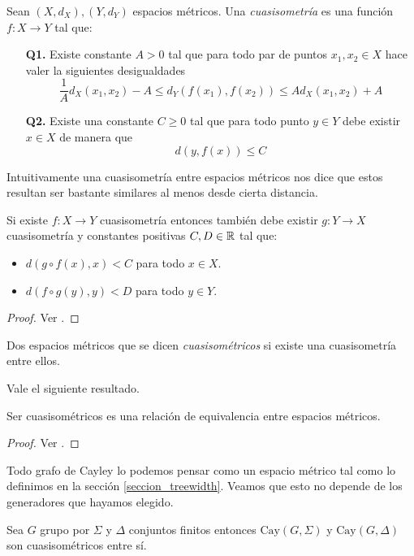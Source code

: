 \documentclass[tesis.tex]{subfiles}
\begin{document}
\begin{deff}
	Sean $(X,d_X),(Y,d_Y)$ espacios métricos. 
	Una \emph{cuasisometría} es una función $f:X \to Y$ tal que:
	\begin{itemize}
		\item[\textbf{Q1.}] Existe constante $A > 0$ tal que para todo par de puntos $x_1,x_2 \in X$ hace valer la siguientes desigualdades
		\[
		\frac{1}{A} d_X(x_1,x_2) - A \le d_Y(f(x_1),f(x_2)) \le A d_X(x_1,x_2) + A
		\]
		\item[\textbf{Q2.}] Existe una constante $C \ge 0$ tal que para todo punto $y \in Y$ debe existir $x \in X$ de manera que 
		\[
		d(y,f(x)) \le C
		\]
	\end{itemize}
\end{deff}

Intuitivamente una cuasisometría entre espacios métricos nos dice que estos resultan ser bastante similares al menos desde cierta distancia. 
\medskip
\begin{prop}
	Si existe $f:X \to Y$ cuasisometría entonces también debe existir $g:Y \to X$ cuasisometría y constantes positivas $C,D \in \mathbb{R}$ tal que:
	\begin{itemize}
		\item $d(g \circ f (x), x) < C$ para todo $x \in X$.
		\item $d(f \circ g (y), y) < D$ para todo $y \in Y$. 
	\end{itemize}
\end{prop}
\begin{proof}
	Ver \cite{loh2017geometric}.
\end{proof}

\begin{deff}
	Dos espacios métricos que se dicen \emph{cuasisométricos} si existe una cuasisometría entre ellos.
\end{deff}

Vale el siguiente resultado.
\begin{prop}
	Ser cuasisométricos es una relación de equivalencia entre espacios métricos.
\end{prop}
\begin{proof}
	Ver \cite{loh2017geometric}.
\end{proof}


Todo grafo de Cayley lo podemos pensar como un espacio métrico tal como lo definimos en la sección \ref{seccion_treewidth}.  
Veamos que esto no depende de los generadores que hayamos elegido.

\begin{prop}
	Sea $G$ grupo \fg por $\Sigma$ y $\Delta$ conjuntos finitos entonces $\text{Cay}(G,\Sigma)$ y $\text{Cay}(G, \Delta)$ son cuasisométricos entre sí.
\end{prop}
\end{document}
